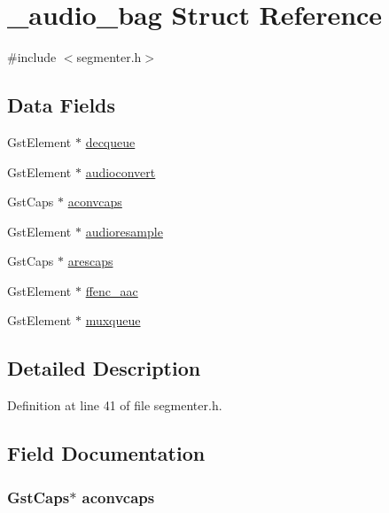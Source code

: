 \hypertarget{struct__audio__bag}{\section{\-\_\-audio\-\_\-bag \-Struct \-Reference}
\label{struct__audio__bag}
}


{\ttfamily \#include $<$segmenter.\-h$>$}

\subsection*{\-Data \-Fields}
\begin{DoxyCompactItemize}
\item 
\-Gst\-Element $\ast$ \hyperlink{struct__audio__bag_a60c8bc4118567d2ebc6ae53bca576f93}{decqueue}
\item 
\-Gst\-Element $\ast$ \hyperlink{struct__audio__bag_a5c648b7312b292946b43b94d35c5aeef}{audioconvert}
\item 
\-Gst\-Caps $\ast$ \hyperlink{struct__audio__bag_a4f83aa4e27ccfef61e6c94972bf22a02}{aconvcaps}
\item 
\-Gst\-Element $\ast$ \hyperlink{struct__audio__bag_ab3ae963e4ecb268062c0408e1046603f}{audioresample}
\item 
\-Gst\-Caps $\ast$ \hyperlink{struct__audio__bag_a740ee81301820a0ab68d91c9f96a9f75}{arescaps}
\item 
\-Gst\-Element $\ast$ \hyperlink{struct__audio__bag_a424c95ed83262d5926c84a1ac8698a8a}{ffenc\-\_\-aac}
\item 
\-Gst\-Element $\ast$ \hyperlink{struct__audio__bag_a917a2aa09433aafbcda72454d53c196f}{muxqueue}
\end{DoxyCompactItemize}


\subsection{\-Detailed \-Description}


\-Definition at line 41 of file segmenter.\-h.



\subsection{\-Field \-Documentation}
\hypertarget{struct__audio__bag_a4f83aa4e27ccfef61e6c94972bf22a02}{
\subsubsection[{aconvcaps}]{\setlength{\rightskip}{0pt plus 5cm}\-Gst\-Caps$\ast$ {\bf aconvcaps}}}\label{struct__audio__bag_a4f83aa4e27ccfef61e6c94972bf22a02}



